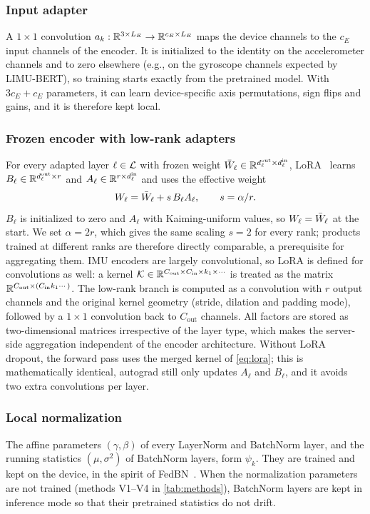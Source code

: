 \subsubsection{Input adapter }
A $1{\times}1$ convolution $a_k:\mathbb{R}^{3\times L_E}\to\mathbb{R}^{c_E\times L_E}$ maps the device channels to
the $c_E$ input channels of the encoder. It is initialized to the identity on the accelerometer
channels and to zero elsewhere (e.g., on the gyroscope channels expected by LIMU-BERT), so
training starts exactly from the pretrained model. With $3c_E+c_E$ parameters, it can learn
device-specific axis permutations, sign flips and gains, and it is therefore kept local.

\subsubsection{Frozen encoder with low-rank adapters }
For every adapted layer $\ell\in\mathcal{L}$ with frozen weight $\bar{W}_\ell\in\mathbb{R}^{d^{\mathrm{out}}_\ell\times
d^{\mathrm{in}}_\ell}$, LoRA~\cite{hu2022lora} learns $B_\ell\in\mathbb{R}^{d^{\mathrm{out}}_\ell\times r}$ and
$A_\ell\in\mathbb{R}^{r\times d^{\mathrm{in}}_\ell}$ and uses the effective weight
\begin{equation}\label{eq:lora}
  W_\ell=\bar{W}_\ell+s\,B_\ell A_\ell,\qquad s=\alpha/r .
\end{equation}
$B_\ell$ is initialized to zero and $A_\ell$ with Kaiming-uniform values, so $W_\ell=\bar{W}_\ell$ at the
start. We set $\alpha=2r$, which gives the same scaling $s=2$ for every rank; products trained at
different ranks are therefore directly comparable, a prerequisite for aggregating them. IMU
encoders are largely convolutional, so LoRA is defined for convolutions as well: a kernel
$\mathcal{K}\in\mathbb{R}^{C_{\mathrm{out}}\times C_{\mathrm{in}}\times k_1\times\cdots}$ is treated as the matrix
$\mathbb{R}^{C_{\mathrm{out}}\times(C_{\mathrm{in}}k_1\cdots)}$. The low-rank branch is computed as a
convolution with $r$ output channels and the original kernel geometry (stride, dilation and
padding mode), followed by a $1{\times}1$ convolution back to $C_{\mathrm{out}}$ channels. All
factors are stored as two-dimensional matrices irrespective of the layer type, which makes the
server-side aggregation independent of the encoder architecture. Without LoRA dropout, the
forward pass uses the merged kernel of \cref{eq:lora}; this is mathematically identical, autograd
still only updates $A_\ell$ and $B_\ell$, and it avoids two extra convolutions per layer.

\subsubsection{Local normalization }
The affine parameters $(\gamma,\beta)$ of every LayerNorm and BatchNorm layer, and the running
statistics $(\mu,\sigma^2)$ of BatchNorm layers, form $\psi_k$. They are trained and kept on the
device, in the spirit of FedBN~\cite{li2021fedbn}. When the normalization parameters are not
trained (methods V1--V4 in \cref{tab:methods}), BatchNorm layers are kept in inference mode so that
their pretrained statistics do not drift.

